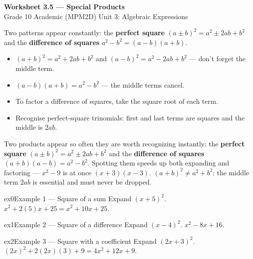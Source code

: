 \documentclass[11pt]{article}
\begin{document}
\begin{center}
{\LARGE\bfseries\color{titleblue}Worksheet 3.5 --- Special Products}\\[2pt]
{\small Grade 10 Academic (MPM2D) \textperiodcentered{} Unit 3: Algebraic Expressions}
\end{center}

\begin{ideabox}
Two patterns appear constantly: the \textbf{perfect square} $(a\pm b)^2=a^2\pm2ab+b^2$ and the \textbf{difference of squares} $a^2-b^2=(a-b)(a+b)$.
\begin{itemize}[leftmargin=*,itemsep=2pt]
  \item $(a+b)^2=a^2+2ab+b^2$ and $(a-b)^2=a^2-2ab+b^2$ --- don't forget the middle term.
  \item $(a-b)(a+b)=a^2-b^2$ --- the middle terms cancel.
  \item To factor a difference of squares, take the square root of each term.
  \item Recognise perfect-square trinomials: first and last terms are squares and the middle is $2ab$.
\end{itemize}
\end{ideabox}

\begin{learnbox}
Two products appear so often they are worth recognizing instantly: the \textbf{perfect square} $(a\pm b)^2=a^2\pm 2ab+b^2$ and the \textbf{difference of squares} $(a+b)(a-b)=a^2-b^2$.
Spotting them speeds up both expanding and factoring — $x^2-9$ is at once $(x+3)(x-3)$.
$(a+b)^2\ne a^2+b^2$: the middle term $2ab$ is essential and must never be dropped.
\end{learnbox}


\begin{example}{ex0}{Example 1 --- Square of a sum}
Expand $(x+5)^2$.
\soln $x^2+2(5)x+25=x^2+10x+25.$
\end{example}

\begin{example}{ex1}{Example 2 --- Square of a difference}
Expand $(x-4)^2$.
\soln $x^2-8x+16.$
\end{example}

\begin{example}{ex2}{Example 3 --- Square with a coefficient}
Expand $(2x+3)^2$.
\soln $(2x)^2+2(2x)(3)+9=4x^2+12x+9.$
\end{example}
\end{document}
